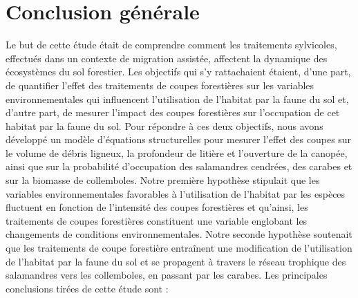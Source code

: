 \chapter*{Conclusion générale}           %
\label{chap-conclusion}         %

Le but de cette étude était de comprendre comment les traitements sylvicoles, effectués dans un contexte de migration assistée, affectent la dynamique des écosystèmes du sol forestier.
Les objectifs qui s’y rattachaient étaient, d'une part, de quantifier l'effet des traitements de coupes forestières sur les variables environnementales qui influencent 
l'utilisation de l'habitat par la faune du sol et, d'autre part, de mesurer l'impact des coupes forestières sur l'occupation de cet habitat par la faune du sol.
Pour répondre à ces deux objectifs, nous avons développé un modèle d'équations structurelles pour mesurer l'effet des coupes sur le volume de débris ligneux, 
la profondeur de litière et l'ouverture de la canopée, ainsi que sur la probabilité d'occupation des salamandres cendrées, des carabes et sur la biomasse de collemboles.
Notre première hypothèse stipulait que les variables environnementales favorables à l'utilisation de l'habitat par les espèces fluctuent 
en fonction de l'intensité des coupes forestières et qu'ainsi, les traitements de coupes forestières constituent une variable englobant les changements de conditions environnementales. 
Notre seconde hypothèse soutenait que les traitements de coupe forestière entraînent une modification de l'utilisation de l'habitat par la faune du sol et se propagent à travers 
le réseau trophique des salamandres vers les collemboles, en passant par les carabes. 
Les principales conclusions tirées de cette étude sont :

